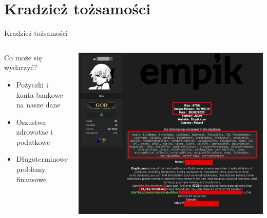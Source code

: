 \section{Kradzież tożsamości}
\begin{frame}{Kradzież tożsamości}
\begin{columns}[c]
    \begin{block}{Co może się wydarzyć?}
    \begin{itemize}
    \item Pożyczki i konta bankowe na nasze dane
    \item Oszustwa zdrowotne i podatkowe
    \item Długoterminowe problemy finansowe
    \end{itemize}
    \end{block}
    \centering
    \includegraphics[width=1\textwidth]{images/empik-wyciek.jpg}
\end{columns}
\end{frame}

